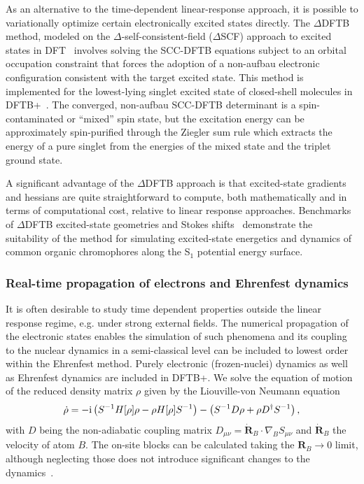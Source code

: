 \documentclass[reprint,onecolumn,superscriptaddress]{revtex4-1}
\newcommand{\dftbp}{DFTB+}
\begin{document}
As an alternative to the time-dependent linear-response approach, it is possible
to variationally optimize certain electronically excited states directly. The
$\Delta$DFTB method, modeled on the $\Delta$-self-consistent-field ($\Delta$SCF)
approach to excited states in DFT~\cite{Ziegler1977,Kowalczyk2011} involves
solving the SCC-DFTB equations subject to an orbital occupation constraint that
forces the adoption of a non-aufbau electronic configuration consistent with the
target excited state. This method is implemented for the lowest-lying singlet
excited state of closed-shell molecules in \dftbp{}~\cite{Kowalczyk2016}. The
converged, non-aufbau SCC-DFTB determinant is a spin-contaminated or ``mixed''
spin state, but the excitation energy can be approximately spin-purified through
the Ziegler sum rule which extracts the energy of a pure singlet from the
energies of the mixed state and the triplet ground state.

A significant advantage of the $\Delta$DFTB approach is that excited-state
gradients and hessians are quite straightforward to compute, both mathematically
and in terms of computational cost, relative to linear response
approaches. Benchmarks of $\Delta$DFTB excited-state geometries and Stokes
shifts~\cite{Kowalczyk2016} demonstrate the suitability of the method for
simulating excited-state energetics and dynamics of common organic chromophores
along the S$_1$ potential energy surface.

\subsubsection{Real-time propagation of electrons and Ehrenfest dynamics}

It is often desirable to study time dependent properties outside the linear
response regime, e.g. under strong external fields. The numerical propagation of
the electronic states enables the simulation of such phenomena and its coupling
to the nuclear dynamics in a semi-classical level can be included to lowest order
within the Ehrenfest method. Purely electronic (frozen-nuclei) dynamics as well
as Ehrenfest dynamics are included in \dftbp{}. We solve the equation of motion
of the reduced density matrix $\rho$ given by the Liouville-von Neumann equation
\begin{equation}
  \dot{\rho}=-\mathrm{i}\left(S^{-1} H[\rho] \rho-\rho H[\rho]
  S^{-1}\right)-\left(S^{-1} D \rho+\rho D^{\dagger} S^{-1}\right)
  \label{eq:rhodot}
  \text,
\end{equation}
with $D$ being the non-adiabatic coupling matrix $D_{\mu \nu} =
\dot{\mathbf{R}}_B \cdot \nabla_B S_{\mu \nu}$ and $\dot{\mathbf{R}}_B$ the
velocity of atom $B$. The on-site blocks can be calculated taking the
$\mathbf{R}_B \to 0$ limit, although neglecting those does not introduce
significant changes to the dynamics~\cite{Niehaus:2005da}.
\end{document}
